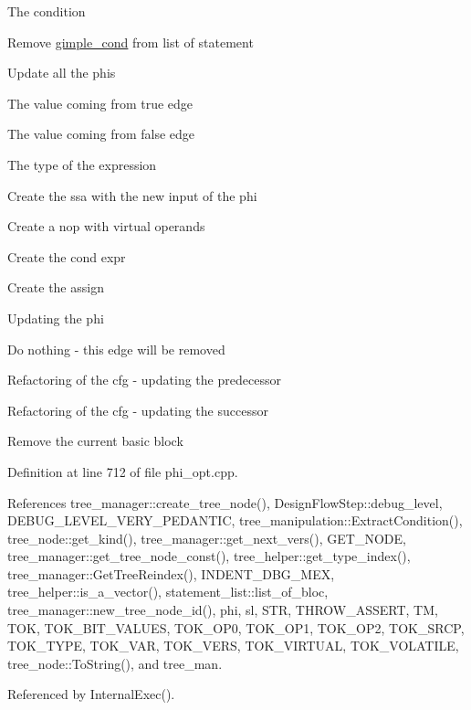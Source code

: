 The condition

Remove \hyperlink{structgimple__cond}{gimple\+\_\+cond} from list of statement

Update all the phis

The value coming from true edge

The value coming from false edge

The type of the expression

Create the ssa with the new input of the phi

Create a nop with virtual operands

Create the cond expr

Create the assign

Updating the phi

Do nothing -\/ this edge will be removed

Refactoring of the cfg -\/ updating the predecessor

Refactoring of the cfg -\/ updating the successor

Remove the current basic block 

Definition at line 712 of file phi\+\_\+opt.\+cpp.



References tree\+\_\+manager\+::create\+\_\+tree\+\_\+node(), Design\+Flow\+Step\+::debug\+\_\+level, D\+E\+B\+U\+G\+\_\+\+L\+E\+V\+E\+L\+\_\+\+V\+E\+R\+Y\+\_\+\+P\+E\+D\+A\+N\+T\+IC, tree\+\_\+manipulation\+::\+Extract\+Condition(), tree\+\_\+node\+::get\+\_\+kind(), tree\+\_\+manager\+::get\+\_\+next\+\_\+vers(), G\+E\+T\+\_\+\+N\+O\+DE, tree\+\_\+manager\+::get\+\_\+tree\+\_\+node\+\_\+const(), tree\+\_\+helper\+::get\+\_\+type\+\_\+index(), tree\+\_\+manager\+::\+Get\+Tree\+Reindex(), I\+N\+D\+E\+N\+T\+\_\+\+D\+B\+G\+\_\+\+M\+EX, tree\+\_\+helper\+::is\+\_\+a\+\_\+vector(), statement\+\_\+list\+::list\+\_\+of\+\_\+bloc, tree\+\_\+manager\+::new\+\_\+tree\+\_\+node\+\_\+id(), phi, sl, S\+TR, T\+H\+R\+O\+W\+\_\+\+A\+S\+S\+E\+RT, TM, T\+OK, T\+O\+K\+\_\+\+B\+I\+T\+\_\+\+V\+A\+L\+U\+ES, T\+O\+K\+\_\+\+O\+P0, T\+O\+K\+\_\+\+O\+P1, T\+O\+K\+\_\+\+O\+P2, T\+O\+K\+\_\+\+S\+R\+CP, T\+O\+K\+\_\+\+T\+Y\+PE, T\+O\+K\+\_\+\+V\+AR, T\+O\+K\+\_\+\+V\+E\+RS, T\+O\+K\+\_\+\+V\+I\+R\+T\+U\+AL, T\+O\+K\+\_\+\+V\+O\+L\+A\+T\+I\+LE, tree\+\_\+node\+::\+To\+String(), and tree\+\_\+man.



Referenced by Internal\+Exec().


